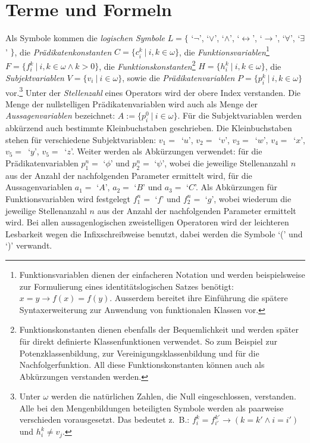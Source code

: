 \documentclass[a4paper,german,10pt,twoside]{book}
\theoremstyle{definition}
\theoremstyle{remark}
\begin{document}
\section{Terme und Formeln} \label{chapter2_section1} \hypertarget{chapter2_section1}{}
Als Symbole kommen die \emph{logischen Symbole} $L = \{$ \mbox{`$\neg$'}, \mbox{`$\vee$'}, \mbox{`$\wedge$'},             \mbox{`$\leftrightarrow$'}, \mbox{`$\rightarrow$'}, \mbox{`$\forall$'}, \mbox{`$\exists$'} $\}$, die 
\emph{Pr{\"a}dikatenkonstanten} $C = \{c^k_i~|~i, k \in \omega\}$, die 
\emph{Funktionsvariablen}\footnote{Funktionsvariablen dienen der einfacheren Notation und werden beispielsweise zur Formulierung eines identit{\"a}tslogischen Satzes ben{\"o}tigt: $x = y \rightarrow f(x) = f(y)$. Ausserdem bereitet ihre Einf{\"u}hrung die sp{\"a}tere Syntaxerweiterung zur Anwendung von funktionalen Klassen vor.} $F = \{f^k_i~|~i, k \in \omega \land k > 0\}$, die \emph{Funktionskonstanten}\footnote{Funktionskonstanten dienen ebenfalls der Bequemlichkeit und werden sp{\"a}ter f{\"u}r direkt 
definierte Klassenfunktionen verwendet. So zum Beispiel zur Potenzklassenbildung, zur Vereinigungsklassenbildung und f{\"u}r die
Nachfolgerfunktion. All diese Funktionskonstanten k{\"o}nnen auch als Abk{\"u}rzungen verstanden werden.}
$H = \{h^k_i~|~i, k \in \omega\}$, die \emph{Subjektvariablen} 
$V = \{v_i~|~i \in \omega\}$, sowie die \emph{Pr{\"a}dikatenvariablen}
$P = \{p^k_i~|~i, k \in \omega\}$ vor.\footnote{Unter $\omega$ werden die nat{\"u}rlichen Zahlen, die Null eingeschlossen, verstanden. Alle bei den Mengenbildungen beteiligten Symbole werden als paarweise verschieden vorausgesetzt. Das bedeutet z.~B.: $f^k_i = f^{k'}_{i'} \rightarrow (k = k' \land i = i')$ und $h^k_i \neq v_j$.} Unter der \emph{Stellenzahl} eines Operators wird der obere Index verstanden. Die Menge der nullstelligen Pr{\"a}dikatenvariablen wird auch als Menge der
\emph{Aussagenvariablen} bezeichnet: $A := \{p_i^0~|~i \in \omega \}$. 
F{\"u}r die Subjektvariablen werden abk{\"u}rzend auch bestimmte Kleinbuchstaben geschrieben. Die Kleinbuchstaben stehen f{\"u}r verschiedene Subjektvariablen: \mbox{$v_1 = $ `$u$'}, \mbox{$v_2 = $ `$v$'}, \mbox{$v_3 = $ `$w$'}, \mbox{$v_4 = $ `$x$'}, \mbox{$v_5 = $ `$y$'}, \mbox{$v_5 = $ `$z$'}. Weiter werden als Abk{\"u}rzungen verwendet: f{\"u}r die Pr{\"a}dikatenvariablen $p^n_1 = $ `$\phi$' und $p^n_2 = $ `$\psi$', wobei die jeweilige Stellenanzahl $n$ aus der Anzahl der nachfolgenden Parameter ermittelt wird, f{\"u}r die Aussagenvariablen $a_1 = $ `$A$', $a_2 = $ `$B$' und $a_3 = $ `$C$'. Als Abk{\"u}rzungen f{\"u}r Funktionsvariablen wird festgelegt $f^n_1 = $ `$f$' und $f^n_2 = $ `$g$', wobei wiederum die jeweilige Stellenanzahl $n$ aus der Anzahl der nachfolgenden Parameter ermittelt wird. Bei allen aussagenlogischen zwei\-stelligen Operatoren wird der leichteren Lesbarkeit wegen die Infixschreibweise benutzt, dabei werden die Symbole `(' und `)' verwandt. 
\end{document}
